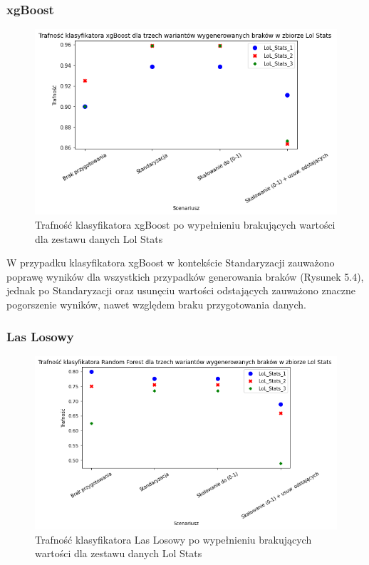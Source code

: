 \documentclass{book}
\begin{document}
\subsubsection{xgBoost}
    \begin{figure}[H]
    \centerline{\includegraphics[scale=0.5]{Lol_stats_xgb_Standaryzacja}}
    \centering
    \caption{Trafność klasyfikatora xgBoost po wypełnieniu brakujących wartości dla zestawu danych Lol Stats}
    \end{figure}

    W przypadku klasyfikatora xgBoost w kontekście Standaryzacji zauważono poprawę wyników 
    dla wszystkich przypadków generowania braków (Rysunek 5.4), 
    jednak po Standaryzacji oraz usunęciu wartości odstających 
    zauważono znaczne pogorszenie wyników, nawet względem braku przygotowania danych.

\subsubsection{Las Losowy}
    \begin{figure}[H]
    \centerline{\includegraphics[scale=0.5]{Lol_stats_rfc_Standaryzacja}}
    \centering
    \caption{Trafność klasyfikatora Las Losowy po wypełnieniu brakujących wartości dla zestawu danych Lol Stats}
    \end{figure}
\end{document}
